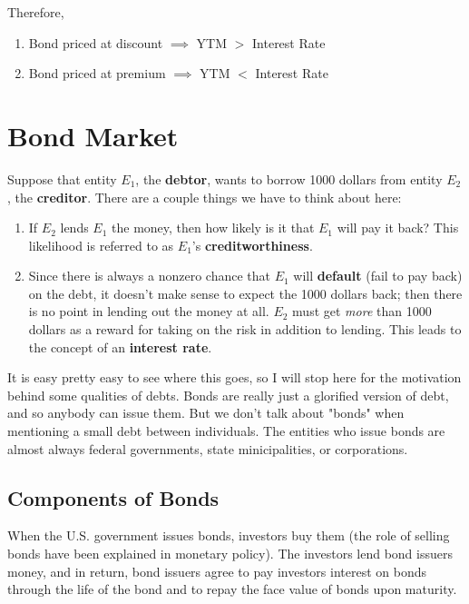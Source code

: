 \documentclass{article}
\begin{document}
    Therefore, 
    \begin{enumerate}
      \item Bond priced at discount $\implies$ YTM $>$ Interest Rate
      \item Bond priced at premium $\implies$ YTM $<$ Interest Rate
    \end{enumerate}

\section{Bond Market}

  Suppose that entity $E_1$, the \textbf{debtor}, wants to borrow 1000 dollars from entity $E_2$, the \textbf{creditor}. There are a couple things we have to think about here:
  \begin{enumerate}
  \item If $E_2$ lends $E_1$ the money, then how likely is it that $E_1$ will pay it back? This likelihood is referred to as $E_1$'s \textbf{creditworthiness}.
  \item Since there is always a nonzero chance that $E_1$ will \textbf{default} (fail to pay back) on the debt, it doesn't make sense to expect the 1000 dollars back; then there is no point in lending out the money at all. $E_2$ must get \textit{more} than 1000 dollars as a reward for taking on the risk in addition to lending. This leads to the concept of an \textbf{interest rate}.
  \end{enumerate}
  It is easy pretty easy to see where this goes, so I will stop here for the motivation behind some qualities of debts. Bonds are really just a glorified version of debt, and so anybody can issue them. But we don't talk about "bonds" when mentioning a small debt between individuals. The entities who issue bonds are almost always federal governments, state minicipalities, or corporations.

  \subsection{Components of Bonds}

    When the U.S. government issues bonds, investors buy them (the role of selling bonds have been explained in monetary policy). The investors lend bond issuers money, and in return, bond issuers agree to pay investors interest on bonds through the life of the bond and to repay the face value of bonds upon maturity.
\end{document}
